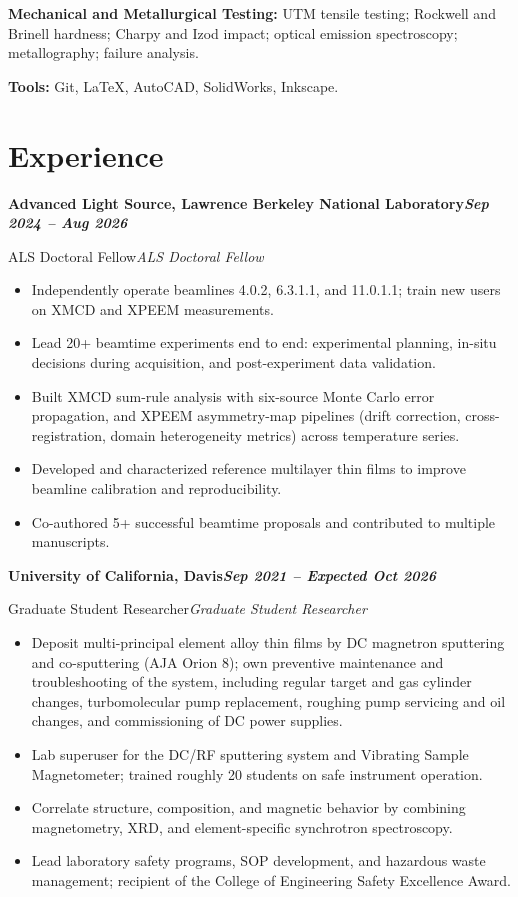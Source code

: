 \documentclass[10pt,letterpaper]{article}
\newcommand{\entry}[3]{%
  \vspace{0.3em}%
  \noindent\textbf{#1}\hfill\textbf{\textit{#2}}\par
  \def\tempthird{#3}\ifx\tempthird\empty\else\noindent\textit{#3}\par\fi
  \vspace{0.05em}%
}
\newcommand{\skillline}[2]{\vspace{0.2em}\noindent\textbf{#1:} #2\par}
\begin{document}
\skillline{Mechanical and Metallurgical Testing}{UTM tensile testing; Rockwell and Brinell hardness;
Charpy and Izod impact; optical emission spectroscopy; metallography; failure analysis.}

\skillline{Tools}{Git, \LaTeX{}, AutoCAD, SolidWorks, Inkscape.}

\section{Experience}

\entry{Advanced Light Source, Lawrence Berkeley National Laboratory}{Sep 2024 -- Aug 2026}{ALS Doctoral Fellow}
\begin{itemize}
  \item Independently operate beamlines 4.0.2, 6.3.1.1, and 11.0.1.1; train new users on XMCD and
        XPEEM measurements.
  \item Lead 20+ beamtime experiments end to end: experimental planning, in-situ decisions during
        acquisition, and post-experiment data validation.
  \item Built XMCD sum-rule analysis with six-source Monte Carlo error propagation, and XPEEM
        asymmetry-map pipelines (drift correction, cross-registration, domain heterogeneity
        metrics) across temperature series.
  \item Developed and characterized reference multilayer thin films to improve beamline calibration
        and reproducibility.
  \item Co-authored 5+ successful beamtime proposals and contributed to multiple manuscripts.
\end{itemize}

\entry{University of California, Davis}{Sep 2021 -- Expected Oct 2026}{Graduate Student Researcher}
\begin{itemize}
  \item Deposit multi-principal element alloy thin films by DC magnetron sputtering and
        co-sputtering (AJA Orion 8); own preventive maintenance and troubleshooting of the system,
        including regular target and gas cylinder changes, turbomolecular pump replacement, roughing
        pump servicing and oil changes, and commissioning of DC power supplies.
  \item Lab superuser for the DC/RF sputtering system and Vibrating Sample Magnetometer; trained
        roughly 20 students on safe instrument operation.
  \item Correlate structure, composition, and magnetic behavior by combining magnetometry, XRD, and
        element-specific synchrotron spectroscopy.
  \item Lead laboratory safety programs, SOP development, and hazardous waste management; recipient
        of the College of Engineering Safety Excellence Award.
\end{itemize}
\end{document}
